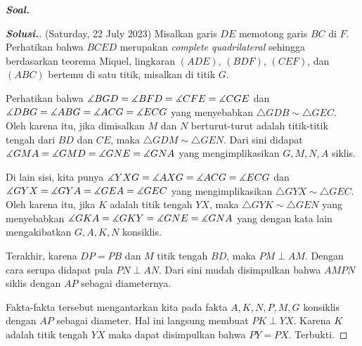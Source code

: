 \textbf{\textit{Soal. }}

\begin{proof}[\textbf{Solusi.}] (Saturday, 22 July 2023)
    Misalkan garis $DE$ memotong garis $BC$ di $F$. Perhatikan bahwa $BCED$ merupakan \textit{complete quadrilateral} sehingga berdasarkan teorema Miquel, lingkaran $(ADE)$, $(BDF)$, $(CEF)$, dan $(ABC)$ bertemu di satu titik, misalkan di titik $G$. 

    

    Perhatikan bahwa $\measuredangle BGD = \measuredangle BFD = \measuredangle CFE = \measuredangle CGE$ dan $\measuredangle DBG = \measuredangle ABG = \measuredangle ACG = \measuredangle ECG$ yang menyebabkan $\triangle GDB \sim \triangle GEC$. Oleh karena itu, jika dimisalkan $M$ dan $N$ berturut-turut adalah titik-titik tengah dari $BD$ dan $CE$, maka $\triangle GDM \sim \triangle GEN$. Dari sini didapat $\measuredangle GMA = \measuredangle GMD = \measuredangle GNE = \measuredangle GNA$ yang mengimplikasikan $G,M,N,A$ siklis. 

    Di lain sisi, kita punya $\measuredangle YXG = \measuredangle AXG = \measuredangle ACG = \measuredangle ECG$ dan $\measuredangle GYX = \measuredangle GYA = \measuredangle GEA = \measuredangle GEC$ yang mengimplikasikan $\triangle GYX \sim \triangle GEC$. Oleh karena itu, jika $K$ adalah titik tengah $YX$, maka $\triangle GYK \sim \triangle GEN$ yang menyebabkan $\measuredangle GKA = \measuredangle GKY = \measuredangle GNE = \measuredangle GNA$ yang dengan kata lain mengakibatkan $G,A,K,N$ konsiklis.

    Terakhir, karena $DP=PB$ dan $M$ titik tengah $BD$, maka $PM \perp AM$. Dengan cara serupa didapat pula $PN \perp AN$. Dari sini mudah disimpulkan bahwa $AMPN$ siklis dengan $AP$ sebagai diameternya.
    
    Fakta-fakta tersebut mengantarkan kita pada fakta $A,K,N,P,M,G$ konsiklis dengan $AP$ sebagai diameter. Hal ini langsung membuat $PK \perp YX$. Karena $K$ adalah titik tengah $YX$ maka dapat disimpulkan bahwa $PY=PX$. Terbukti.
\end{proof}